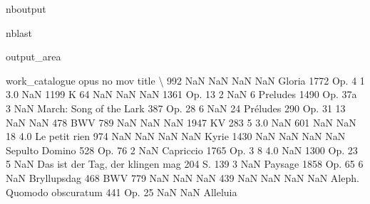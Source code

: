 \documentclass[letterpaper,10pt,english]{sphinxmanual}
\begin{document}
\begin{sphinxuseclass}{nboutput}
\begin{sphinxuseclass}{nblast}
{\begin{sphinxuseclass}{output_area}
\begin{sphinxuseclass}{}
\begin{sphinxVerbatim}[commandchars=\\\{\}]
     work\_catalogue opus   no  mov                             title  \textbackslash{}
992             NaN  NaN  NaN  NaN                            Gloria
1772           Op.     4    1  3.0                               NaN
1199              K   64  NaN  NaN                               NaN
1361            Op.   13    2  NaN                        6 Preludes
1490            Op.  37a    3  NaN           March: Song of the Lark
387             Op.   28    6  NaN                       24 Préludes
290             Op.   31   13  NaN                               NaN
478             BWV  789  NaN  NaN                               NaN
1947             KV  283    5  3.0                               NaN
601             NaN  NaN   18  4.0                     Le petit rien
974             NaN  NaN  NaN  NaN                             Kyrie
1430            NaN  NaN  NaN  NaN                    Sepulto Domino
528             Op.   76    2  NaN                         Capriccio
1765           Op.     3    8  4.0                               NaN
1300            Op.   23    5  NaN  Das ist der Tag, der klingen mag
204              S.  139    3  NaN                           Paysage
1858            Op.   65    6  NaN                       Bryllupsdag
468             BWV  779  NaN  NaN                               NaN
439             NaN  NaN  NaN  NaN         Aleph. Quomodo obscuratum
441             Op.   25  NaN  NaN                          Alleluia


\end{sphinxVerbatim}
\end{sphinxuseclass}
\end{sphinxuseclass}}
\end{sphinxuseclass}
\end{sphinxuseclass}
\end{document}
